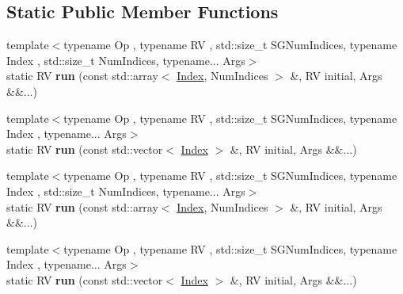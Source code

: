 \subsection*{Static Public Member Functions}
\begin{DoxyCompactItemize}
\item 
\mbox{\label{struct_eigen_1_1internal_1_1tensor__static__symgroup__do__apply_3_01internal_1_1type__list_3_01_c8ec19381230c5f4f1bbf94f4e53c0f0_afe7ed6b4a51f9331bf6149fe5daef485}} 
{\footnotesize template$<$typename Op , typename RV , std\+::size\+\_\+t S\+G\+Num\+Indices, typename Index , std\+::size\+\_\+t Num\+Indices, typename... Args$>$ }\\static RV {\bfseries run} (const std\+::array$<$ \hyperlink{namespace_eigen_a62e77e0933482dafde8fe197d9a2cfde}{Index}, Num\+Indices $>$ \&, RV initial, Args \&\&...)
\item 
\mbox{\label{struct_eigen_1_1internal_1_1tensor__static__symgroup__do__apply_3_01internal_1_1type__list_3_01_c8ec19381230c5f4f1bbf94f4e53c0f0_ad61ad69a6edd2f85f1e35396dc79ab5b}} 
{\footnotesize template$<$typename Op , typename RV , std\+::size\+\_\+t S\+G\+Num\+Indices, typename Index , typename... Args$>$ }\\static RV {\bfseries run} (const std\+::vector$<$ \hyperlink{namespace_eigen_a62e77e0933482dafde8fe197d9a2cfde}{Index} $>$ \&, RV initial, Args \&\&...)
\item 
\mbox{\label{struct_eigen_1_1internal_1_1tensor__static__symgroup__do__apply_3_01internal_1_1type__list_3_01_c8ec19381230c5f4f1bbf94f4e53c0f0_afe7ed6b4a51f9331bf6149fe5daef485}} 
{\footnotesize template$<$typename Op , typename RV , std\+::size\+\_\+t S\+G\+Num\+Indices, typename Index , std\+::size\+\_\+t Num\+Indices, typename... Args$>$ }\\static RV {\bfseries run} (const std\+::array$<$ \hyperlink{namespace_eigen_a62e77e0933482dafde8fe197d9a2cfde}{Index}, Num\+Indices $>$ \&, RV initial, Args \&\&...)
\item 
\mbox{\label{struct_eigen_1_1internal_1_1tensor__static__symgroup__do__apply_3_01internal_1_1type__list_3_01_c8ec19381230c5f4f1bbf94f4e53c0f0_ad61ad69a6edd2f85f1e35396dc79ab5b}} 
{\footnotesize template$<$typename Op , typename RV , std\+::size\+\_\+t S\+G\+Num\+Indices, typename Index , typename... Args$>$ }\\static RV {\bfseries run} (const std\+::vector$<$ \hyperlink{namespace_eigen_a62e77e0933482dafde8fe197d9a2cfde}{Index} $>$ \&, RV initial, Args \&\&...)
\end{DoxyCompactItemize}


